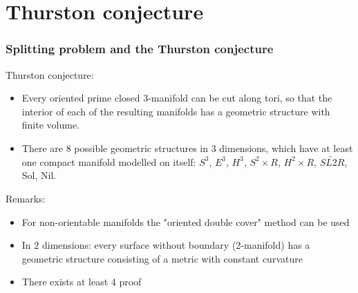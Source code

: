 \section{Thurston conjecture}
\begin{frame}
  \frametitle{Splitting problem and the Thurston conjecture}
  Thurston conjecture:
  \begin{itemize}
    \item Every oriented prime closed 3-manifold can be cut along tori, so that
      the interior of each of the resulting manifolds has a geometric structure
      with finite volume.
    \item There are 8 possible geometric structures in 3 dimensions, which have
      at least one compact manifold modelled on itself: $S^3$, $E^3$,
      $H^3$, $S^2\times R$, $H^2\times R$, $\widetilde{SL2R}$, Sol,
      Nil.
  \end{itemize}
  Remarks:
  \begin{itemize}
    \item For non-orientable manifolds the "oriented double cover" method can be
      used
    \item In $2$ dimensions: every surface without boundary (2-manifold) has a
      geometric structure consisting of a metric with constant curvature
    \item There exists at least 4 proof
  \end{itemize}
\end{frame}

